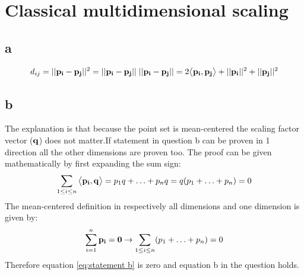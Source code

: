 \documentclass[a4paper,12pt]{article}
\begin{document}
\tableofcontents %
\newpage
\section{Classical multidimensional scaling}
\subsection{a}

\begin{equation}
\begin{aligned}
d_{ij}=||{\bf p_i-p_j}||^2=||{\bf p_i-p_j}||\;||{\bf p_i-p_j}||=2\big \langle{\bf p_i,p_j}\big \rangle+||{\bf p_i}||^2+||{\bf p_j}||^2
\end{aligned}
\end{equation}

\subsection{b}
The explanation is that because the point set is mean-centered the scaling factor vector (${\bf q}$) does not matter.If statement in question b can be proven in 1 direction all the other dimensions are proven too. The proof can be given mathematically by first expanding the sum sign:
\begin{equation}
\begin{aligned}
\sum_{1\leq i \leq n} \big \langle{\bf p_i,q}\big \rangle=p_{1}q+\ldots+p_{n}q=q(p_1+\ldots +p_n)=0
\end{aligned}
\label{eq:statement b}
\end{equation}
The mean-centered definition in respectively all dimensions and one dimension is given by:
\begin{equation}
\begin{aligned}
\sum_{i=1}^n {\bf p_i}={\bf 0 } \rightarrow \sum_{1 \leq i \leq n} (p_1+\ldots +p_n)=0
\end{aligned}
\end{equation}
Therefore equation \ref{eq:statement b} is zero and equation b in the question holds.
\end{document}
